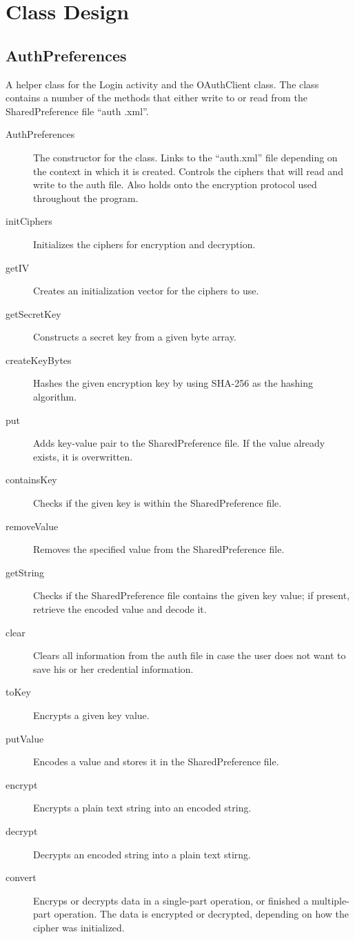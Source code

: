 \documentclass{article}
\begin{document}
\section{Class Design}

\subsection{AuthPreferences}
A helper class for the Login activity and the OAuthClient class. The class contains a 
number of the methods that either write to or read from the SharedPreference file ``auth
.xml''.
\begin{description}
    \item[AuthPreferences] The constructor for the class. Links to the ``auth.xml'' file 
                           depending on the context in which it is created. Controls the 
                           ciphers that will read and write to the auth file. Also holds 
                           onto the encryption protocol used throughout the program.
    \item[initCiphers] Initializes the ciphers for encryption and decryption.
    \item[getIV] Creates an initialization vector for the ciphers to use.
    \item[getSecretKey] Constructs a secret key from a given byte array.
    \item[createKeyBytes] Hashes the given encryption key by using SHA-256 as the hashing 
                          algorithm.
    \item[put] Adds key-value pair to the SharedPreference file. If the value already 
               exists, it is overwritten.
    \item[containsKey] Checks if the given key is within the SharedPreference file.
    \item[removeValue] Removes the specified value from the SharedPreference file.
    \item[getString] Checks if the SharedPreference file contains the given key value; if 
                     present, retrieve the encoded value and decode it.
    \item[clear] Clears all information from the auth file in case the user does not want 
                 to save his or her credential information.
    \item[toKey] Encrypts a given key value.
    \item[putValue] Encodes a value and stores it in the SharedPreference file.
    \item[encrypt] Encrypts a plain text string into an encoded string.
    \item[decrypt] Decrypts an encoded string into a plain text stirng.
    \item[convert] Encryps or decrypts data in a single-part operation, or finished a 
                   multiple-part operation. The data is encrypted or decrypted, depending 
                   on how the cipher was initialized.
\end{description}
 
\end{document}
